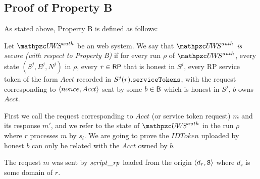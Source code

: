   \subsection{Proof of Property B}
  As stated above, Property B is defined as follows:
  \begin{definition}\label{def:B}
    Let $\uppressoauthwebsystem$ be an \uppresso web system. We say that
    \emph{$\uppressoauthwebsystem$ is secure (with respect to Property B)} if
    for every run $\rho$ of $\uppressoauthwebsystem$, every state $(S^j, E^j, N^j)$
    in $\rho$, every $r\in \mathsf{RP}$ that is honest in $S^j$, 
    every RP service token of the form $Acct$ recorded in
    $S^j(r).\mathtt{serviceTokens}$, with the request corresponding to
    $\langle {{}nonce, Acct} \rangle$ sent by some $b\in \mathsf{B}$ which is honest in $S^j$, $b$ owns $Acct$.
  \end{definition}
  
  First we call the request corresponding to $Acct$ (or service token request) $m$ and
  its response $m'$, and we refer to the state of $\uppressoauthwebsystem$ in the run 
  $\rho$ where $r$ processes $m$ by $s_l$. We are going to prove the $IDToken$ uploaded 
  by honest $b$ can only be related with the $Acct$ owned by $b$.
  
  
  \begin{lemma}\label{lemma:request-m-is-from-script-rp}
    The request $m$ was sent by $\mathit{script\_rp}$ loaded from 
    the origin $\langle d_r, \mathtt{S}\rangle$ where $d_r$ is some domain of 
    $r$.
  \end{lemma}
  
